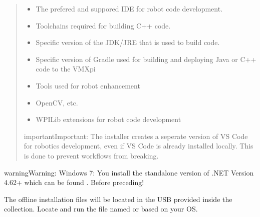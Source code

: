 \documentclass[letterpaper,10pt,english]{sphinxmanual}
\begin{document}
\begin{quote}
\begin{itemize}
\item {} 
 \sphinxhyphen{} The prefered and suppored IDE for robot code development.

\item {} 
 \sphinxhyphen{} Toolchains required for building C++ code.

\item {} 
 \sphinxhyphen{} Specific version of the JDK/JRE that is used to build code.

\item {} 
 \sphinxhyphen{} Specific version of Gradle used for building and deploying Java or C++ code to the VMXpi

\item {} 
 \sphinxhyphen{} Tools used for robot enhancement

\item {} 
 \sphinxhyphen{} OpenCV, etc.

\item {} 
 \sphinxhyphen{} WPILib extensions for robot code development

\end{itemize}

\begin{sphinxadmonition}{important}{Important:}
The installer creates a seperate version of VS Code for robotics development, even if VS Code is already installed locally. This is done to prevent workflows from breaking.
\end{sphinxadmonition}
\end{quote}


\begin{sphinxadmonition}{warning}{Warning:}
Windows 7: You  install the standalone version of .NET Version 4.62+ which can be found . Before preceding!
\end{sphinxadmonition}

The offline installation files will be located in the USB provided inside the collection. Locate and run the file named  or  based on your OS.
\end{document}
